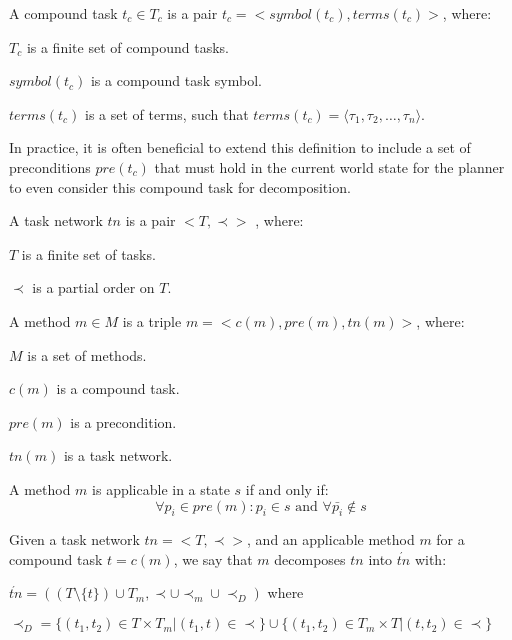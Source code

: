 \begin{Tdef}
    A compound task $t_c \in T_c$ is a pair $t_c = <symbol(t_c),terms(t_c)>$, where:
    \vspace{-0.5em}
    \begin{compactitem}
    \item 
    $T_c$ is a finite set of compound tasks.
    \item 
    $symbol(t_c)$ is a compound task symbol.
    \item 
    $terms(t_c)$  is a set of terms, such that $terms(t_c) = \langle \tau_1, \tau_2, \dots, \tau_n \rangle$.
    \end{compactitem}

    In practice, it is often beneficial to extend this definition to include a set of preconditions $pre(t_c)$ that must hold in the current world state for the planner to even consider this compound task for decomposition.
\end{Tdef}

\begin{Tdef}
    A task network $tn$ is a pair $<T, \prec>$ , where:
    \vspace{-0.5em}
    \begin{compactitem}
    \item 
    $T$ is a finite set of tasks.
    \item 
    $\prec$ is a partial order on $T$.
    \end{compactitem}
\end{Tdef}

\begin{Tdef}[Method]
    A method $m \in M$ is a triple $m = <c(m), pre(m), tn(m)>$, where:
    \vspace{-0.5em}
    \begin{compactitem}
    \item 
    $M$ is a set of methods.
    \item 
    $c(m)$ is a compound task.
    \item 
    $pre(m)$ is a precondition.
    \item 
    $tn(m)$ is a task network.
    \end{compactitem}
    A method $m$ is applicable in a state $s$ if and only if:
    \vspace{-0.5em}
    $$\forall p_i \in pre(m): p_i\in s \text{ and } \forall \bar{p_i} \notin s$$
\end{Tdef}

\begin{Tdef}[Decomposition]
   Given a task network $tn=<T, \prec>$, and an applicable method $m$ for a compound task $t= c(m)$, we say that $m$ decomposes $tn$ into $\acute{tn}$ with:
   \vspace{-0.5em}
    \begin{compactitem}
    \item 
    $\acute{tn} = ((T \setminus\{ t \}) \cup T_m, \prec \cup \prec_m \cup \prec_D) $ where 
    \item 
    $\prec_D = \{ (t_1, t_2) \in T \times T_m | (t_1, t) \in  \prec\} \cup \{ (t_1, t_2) \in T_m \times T | (t, t_2) \in  \prec\}$ 
    \end{compactitem}
\end{Tdef}


